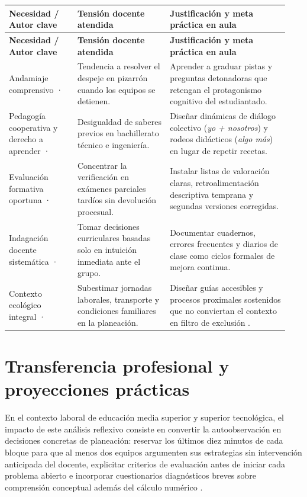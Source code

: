 \documentclass[spanish,letterpaper,oneside]{article}
\begin{document}
{\small{}\renewcommand{\arraystretch}{1.32}
\begin{longtable}{|>{\raggedright\arraybackslash}p{0.23\linewidth}|>{\raggedright\arraybackslash}p{0.31\linewidth}|>{\raggedright\arraybackslash}p{0.40\linewidth}|}\hline
\rowcolor{iiiepePale} \textbf{Necesidad / Autor clave} & \textbf{Tensión docente atendida} & \textbf{Justificación y meta práctica en aula} \\\hline
\endfirsthead
\hline
\rowcolor{iiiepePale} \textbf{Necesidad / Autor clave} & \textbf{Tensión docente atendida} & \textbf{Justificación y meta práctica en aula} \\\hline
\endhead
Andamiaje comprensivo · \citet{sawyer2008optimizing} & Tendencia a resolver el despeje en pizarrón cuando los equipos se detienen. & Aprender a graduar pistas y preguntas detonadoras que retengan el protagonismo cognitivo del estudiantado. \\\hline
Pedagogía cooperativa y derecho a aprender · \citet{meirieu2020escuela} & Desigualdad de saberes previos en bachillerato técnico e ingeniería. & Diseñar dinámicas de diálogo colectivo (\textit{yo + nosotros}) y rodeos didácticos (\textit{algo más}) en lugar de repetir recetas. \\\hline
Evaluación formativa oportuna · \citet{eef2021feedback,pimienta2008evaluacion} & Concentrar la verificación en exámenes parciales tardíos sin devolución procesual. & Instalar listas de valoración claras, retroalimentación descriptiva temprana y segundas versiones corregidas. \\\hline
Indagación docente sistemática · \citet{restrepo2004investigacion} & Tomar decisiones curriculares basadas solo en intuición inmediata ante el grupo. & Documentar cuadernos, errores frecuentes y diarios de clase como ciclos formales de mejora continua. \\\hline
Contexto ecológico integral · \citet{bronfenbrenner2006bioecologico} & Subestimar jornadas laborales, transporte y condiciones familiares en la planeación. & Diseñar guías accesibles y procesos proximales sostenidos que no conviertan el contexto en filtro de exclusión \citep{bostrom2023formative}. \\\hline
\end{longtable}}

\section{Transferencia profesional y proyecciones prácticas}
En el contexto laboral de educación media superior y superior tecnológica, el impacto de este análisis reflexivo consiste en convertir la autoobservación en decisiones concretas de planeación: reservar los últimos diez minutos de cada bloque para que al menos dos equipos argumenten sus estrategias sin intervención anticipada del docente, explicitar criterios de evaluación antes de iniciar cada problema abierto e incorporar cuestionarios diagnósticos breves sobre comprensión conceptual además del cálculo numérico \citep{bostrom2023formative}.
\end{document}
